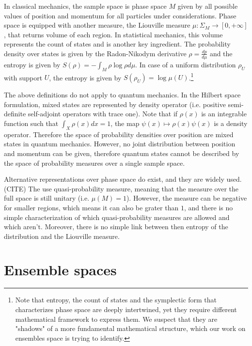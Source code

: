 \documentclass[10pt,twocolumn, nofootinbib]{revtex4-2}
\begin{document}
In classical mechanics, the sample space is phase space $M$ given by all possible values of position and momentum for all particles under considerations. Phase space is equipped with another measure, the Liouville measure $\mu : \Sigma_M \to [0, +\infty]$, that returns volume of each region. In statistical mechanics, this volume represents the count of states and is another key ingredient. The probability density over states is given by the Radon-Nikodym derivative $\rho = \frac{dp}{d\mu}$ and the entropy is given by $S(\rho) = - \int_M \rho \log \rho d\mu$. In case of a uniform distribution $\rho_U$ with support $U$, the entropy is given by $S(\rho_U) = \log \mu(U)$.\footnote{Note that entropy, the count of states and the symplectic form that characterizes phase space are deeply intertwined, yet they require different mathematical framework to express them. We suspect that they are "shadows" of a more fundamental mathematical structure, which our work on ensembles space is trying to identify.}

The above definitions do not apply to quantum mechanics. In the Hilbert space formulation, mixed states are represented by density operator (i.e. positive semi-definite self-adjoint operators with trace one). Note that if $\rho(x)$ is an integrable function such that $\int_X \rho(x) dx = 1$, the map $\psi(x) \mapsto \rho(x) \psi(x)$ is a density operator. Therefore the space of probability densities over position are mixed states in quantum mechanics. However, no joint distribution between position and momentum can be given, therefore quantum states cannot be described by the space of probability measures over a single sample space.

Alternative representations over phase space do exist, and they are widely used.(CITE) The use quasi-probability measure, meaning that the measure over the full space is still unitary (i.e. $\mu(M) =1$). However, the measure can be negative for smaller regions, which means it can also be grater than $1$, and there is no simple characterization of which quasi-probability measures are allowed and which aren't. Moreover, there is no simple link between then entropy of the distribution and the Liouville measure.

\section{Ensemble spaces}
\end{document}
